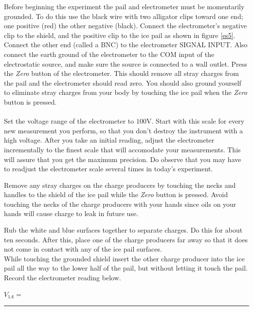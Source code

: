 {{{{\noindent Before beginning the experiment the pail and
electrometer must be momentarily grounded.  To do this use the
black wire with two alligator clips toward one end; one positive
(red) the other negative (black).  Connect the electrometer's
negative clip to the shield, and the positive clip to the ice pail
as shown in figure \ref{es5}.  Connect the other end (called a
BNC) to the electrometer SIGNAL INPUT.  Also connect the earth
ground of the electrometer to the COM input of the electrostatic
source, and make sure the source is connected to a wall outlet.
Press the {\it Zero} button of the electrometer. This should
remove all stray charges from the pail and the electrometer
should read zero. You should also ground yourself to eliminate
stray charges from your body by touching the
ice pail when the {\it Zero} button is pressed.\\

\\
\noindent Set the voltage range of the electrometer to $100$V. Start with
this scale for every new measurement you perform, so that you don't destroy
the instrument with a high voltage. After you take an initial reading, adjust
the electrometer incrementally to the finest scale that will accomodate your
measurements. This will assure that you get the maximum precision. Do observe
that you may have to readjust the electrometer scale several times in today's
experiment.

\noindent Remove any stray charges on the charge producers by touching the
necks and handles to the shield of the ice pail while the {\it Zero} button is
pressed.  Avoid touching the necks of the charge producers with your hands
since oils on your hands will cause charge to leak in future use. 

\noindent Rub the white and blue
surfaces together to separate charges. Do this for about ten seconds.  After
this, place one of the charge producers far away so that it does not come in
contact with any of the ice pail surfaces.\\
\noindent While touching the grounded shield insert the other
charge producer into the ice pail all the way to the lower half of
the pail, but without letting it touch the pail.  Record the
electrometer reading below.\\ 

\vspace{1cm}

\hspace{4cm}$V_{1A}=$\rule{5.0cm}{.1mm}\\

}}}}
